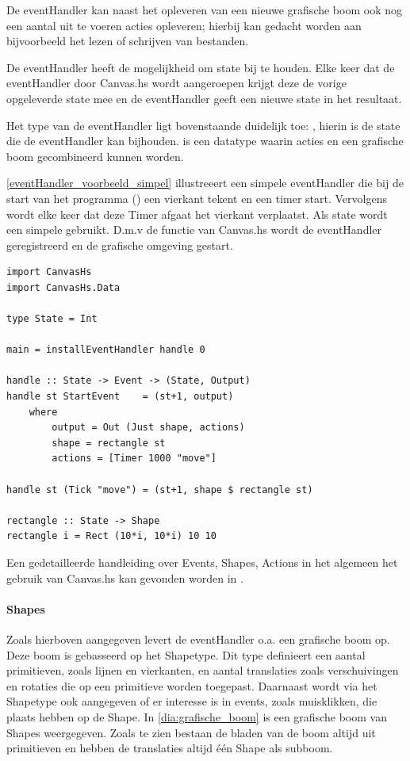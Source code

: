 De eventHandler kan naast het opleveren van een nieuwe grafische boom ook nog een aantal uit te voeren acties opleveren; hierbij kan gedacht worden aan bijvoorbeeld het lezen of schrijven van bestanden. 

De eventHandler heeft de mogelijkheid om state bij te houden. Elke keer dat de eventHandler door Canvas.hs wordt aangeroepen krijgt deze de vorige opgeleverde state mee en de eventHandler geeft een nieuwe state in het resultaat. 

Het type van de eventHandler ligt bovenstaande duidelijk toe: , hierin is  de state die de eventHandler kan bijhouden.  is een datatype waarin acties en een grafische boom gecombineerd kunnen worden.

\autoref{eventHandler_voorbeeld_simpel} illustreeert een simpele eventHandler die bij de start van het programma () een vierkant tekent en een timer start. Vervolgens wordt elke keer dat deze Timer afgaat het vierkant verplaatst. Als state wordt een simpele  gebruikt. D.m.v de  functie van Canvas.hs wordt de eventHandler geregistreerd en de grafische omgeving gestart.

\begin{lstlisting}[caption=Voorbeeld van een simpele eventHandler, label=eventHandler_voorbeeld_simpel]
import CanvasHs
import CanvasHs.Data

type State = Int

main = installEventHandler handle 0

handle :: State -> Event -> (State, Output)
handle st StartEvent    = (st+1, output)
	where 
		output = Out (Just shape, actions)
		shape = rectangle st
		actions = [Timer 1000 "move"]
		
handle st (Tick "move") = (st+1, shape $ rectangle st)
		
rectangle :: State -> Shape
rectangle i = Rect (10*i, 10*i) 10 10
\end{lstlisting}

Een gedetailleerde handleiding over Events, Shapes, Actions in het algemeen het gebruik van Canvas.hs kan gevonden worden in .

\paragraph{Shapes}
\label{par:globaal_shapes}
Zoals hierboven aangegeven levert de eventHandler o.a. een grafische boom op. Deze boom is gebasseerd op het Shapetype. Dit type definieert een aantal primitieven, zoals lijnen en vierkanten, en aantal translaties zoals verschuivingen en rotaties die op een primitieve worden toegepast. Daarnaast wordt via het Shapetype ook aangegeven of er interesse is in events, zoals muisklikken, die plaats hebben op de Shape. In \autoref{dia:grafische_boom} is een grafische boom van Shapes weergegeven. Zoals te zien bestaan de bladen van de boom altijd uit primitieven en hebben de translaties altijd één Shape als subboom.

